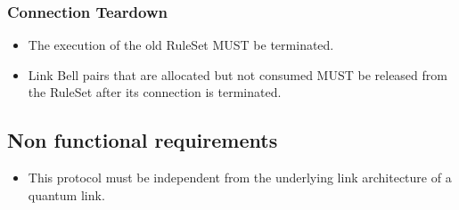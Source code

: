 \subsubsection{Connection Teardown}
\begin{itemize}
\item The execution of the old RuleSet MUST be terminated.
\item Link Bell pairs that are allocated but not consumed MUST be released from the RuleSet after its connection is terminated.
\end{itemize}


\subsection{Non functional requirements}

\begin{itemize}
  \item This protocol must be independent from the underlying link architecture of a quantum link.
\end{itemize}


